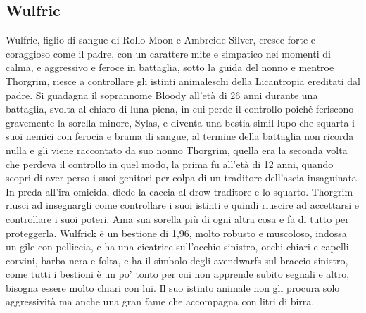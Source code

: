 \documentclass{article}
\begin{document}
\subsection{Wulfric}
Wulfric, figlio di sangue  di Rollo Moon e Ambreide Silver, cresce forte e coraggioso come il padre, con un carattere mite e simpatico nei momenti di calma, e aggressivo e feroce in battaglia, sotto la guida del nonno e mentroe Thorgrim, riesce a controllare gli istinti animaleschi della Licantropia ereditati dal padre. Si guadagna il soprannome  Bloody all'età di 26 anni durante una battaglia, svolta al chiaro di luna piena, in cui perde il controllo poiché feriscono gravemente la sorella minore, Sylas,  e diventa una bestia simil lupo che squarta i suoi nemici con ferocia e brama di sangue, al termine della battaglia non ricorda nulla e gli viene raccontato da suo nonno Thorgrim, quella era la seconda volta che perdeva il controllo in quel modo, la prima fu all'età di 12 anni, quando scopri di aver perso i suoi genitori per colpa di un traditore dell'ascia insaguinata. In preda all'ira omicida, diede la caccia al drow traditore e lo squarto. Thorgrim riusci ad insegnargli come controllare i suoi istinti e quindi riuscire ad accettarsi e controllare i suoi poteri. Ama sua sorella più di ogni altra cosa e fa di tutto per proteggerla. Wulfrick è un bestione di 1,96, molto robusto e muscoloso, indossa un gile con pelliccia, e ha una cicatrice sull'occhio sinistro, occhi chiari e capelli corvini, barba nera e folta, e ha il simbolo degli avendwarfs sul braccio sinistro, come tutti i bestioni è un po' tonto per cui non apprende subito segnali e altro, bisogna essere molto chiari con lui. Il suo istinto animale non gli procura solo aggressività ma anche una gran fame che accompagna con litri di birra. 
\end{document}
